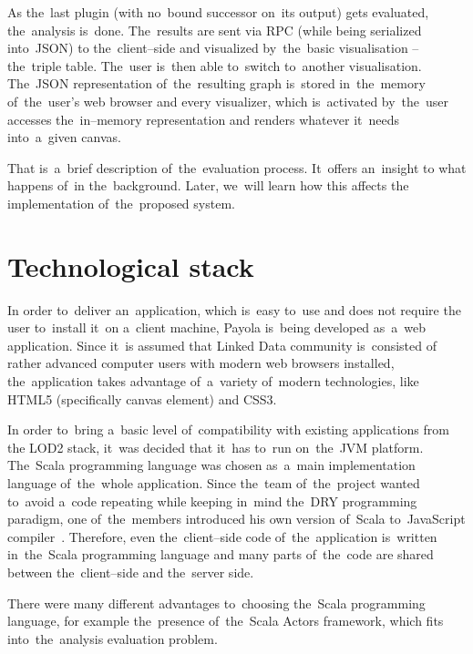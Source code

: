 As the~last plugin (with no~bound successor on~its output) gets evaluated, the~analysis is~done. The~results are sent via RPC (while being serialized into~JSON) 
to the~client--side and visualized by~the~basic visualisation -- the~triple 
table. The~user is~then able to~switch to~another visualisation. The~JSON 
representation of~the~resulting graph is~stored in~the~memory of~the~user's web 
browser and every visualizer, which is~activated by~the~user accesses the~in--memory representation and renders whatever it~needs into~a~given canvas.

That is~a~brief description of~the~evaluation process. It~offers an~insight
to what happens of~in the~background. Later, we~will learn how this affects 
the implementation of~the~proposed system.

\section{Technological stack}
In order to~deliver an~application, which is~easy to~use and does not require 
the user to~install it~on a~client machine, Payola is~being developed as~a~web
application. Since it~is assumed that Linked Data community is~consisted of
rather advanced computer users with modern web browsers installed, the~application 
takes advantage of~a~variety of~modern technologies, like HTML5 (specifically
canvas element) and CSS3.

In order to~bring a~basic level of~compatibility with existing applications from 
the LOD2 stack, it~was decided that it~has to~run on~the~JVM platform. The~Scala programming language was chosen as~a~main implementation language of~the~whole application. Since the~team of~the~project wanted to~avoid a~code repeating 
while keeping in~mind the~DRY programming paradigm, one of~the~members 
introduced his own version of~Scala to~JavaScript compiler~\cite{s2js}. Therefore, even the~client--side code of~the~application is~written in~the~Scala programming language 
and many parts of~the~code are shared between the~client--side and the~server 
side.

There were many different advantages to~choosing the~Scala programming language, 
for example the~presence of~the~Scala Actors framework, which fits into~the~analysis evaluation problem.

